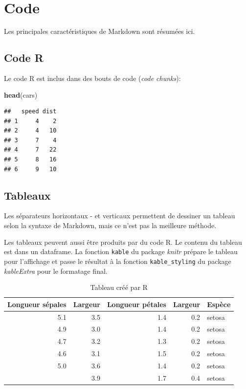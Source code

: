 \documentclass[fleqn,10pt]{ArtEcoFoG} %
\newenvironment{Shaded}{\begin{snugshade}}{\end{snugshade}}
\newcommand{\KeywordTok}[1]{\textcolor[rgb]{0.13,0.29,0.53}{\textbf{{#1}}}}
\newcommand{\NormalTok}[1]{{#1}}
\begin{document}
\hypertarget{code}{%
\section{Code}\label{code}}

Les principales caractéristiques de Markdown sont résumées ici.

\hypertarget{code-r}{%
\subsection{Code R}\label{code-r}}

Le code R est inclus dans des bouts de code (\emph{code chunks}):

\begin{Shaded}
\begin{Highlighting}[]
\KeywordTok{head}\NormalTok{(cars)}
\end{Highlighting}
\end{Shaded}

\begin{verbatim}
##   speed dist
## 1     4    2
## 2     4   10
## 3     7    4
## 4     7   22
## 5     8   16
## 6     9   10
\end{verbatim}

\hypertarget{tableaux}{%
\subsection{Tableaux}\label{tableaux}}

Les séparateurs horizontaux - et verticaux \textbar{} permettent de dessiner un tableau selon la syntaxe de Markdown, mais ce n'est pas la meilleure méthode.

Les tableaux peuvent aussi être produits par du code R.
Le contenu du tableau est dans un dataframe.
La fonction \texttt{kable} du package \emph{knitr} prépare le tableau pour l'affichage et passe le résultat à la fonction \texttt{kable\_styling} du package \emph{kableExtra} pour le formatage final.

\begin{longtable}[t]{rrrrl}
\caption{\label{tab:kable}Tableau créé par R}\\
\toprule
Longueur sépales & Largeur & Longueur pétales & Largeur & Espèce\\
\midrule
5.1 & 3.5 & 1.4 & 0.2 & setosa\\
4.9 & 3.0 & 1.4 & 0.2 & setosa\\
4.7 & 3.2 & 1.3 & 0.2 & setosa\\
4.6 & 3.1 & 1.5 & 0.2 & setosa\\
5.0 & 3.6 & 1.4 & 0.2 & setosa\\
\addlinespace
5.4 & 3.9 & 1.7 & 0.4 & setosa\\
\bottomrule
\end{longtable}
\end{document}
